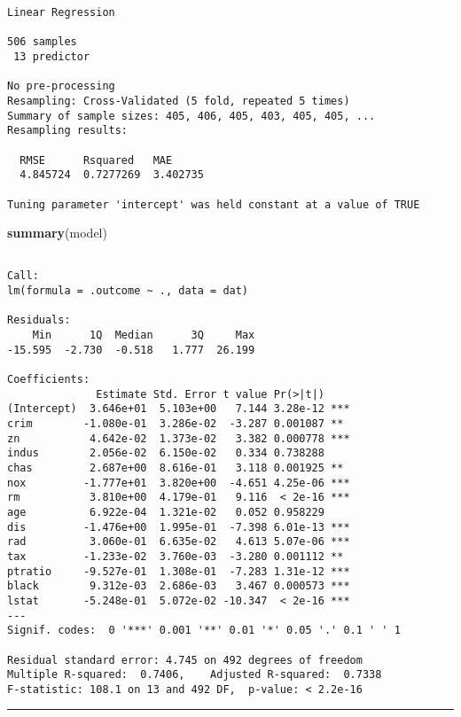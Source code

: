 \documentclass[
]{book}
\newenvironment{Shaded}{\begin{snugshade}}{\end{snugshade}}
\newcommand{\KeywordTok}[1]{\textcolor[rgb]{0.13,0.29,0.53}{\textbf{#1}}}
\newcommand{\NormalTok}[1]{#1}
\begin{document}
\begin{verbatim}
Linear Regression 

506 samples
 13 predictor

No pre-processing
Resampling: Cross-Validated (5 fold, repeated 5 times) 
Summary of sample sizes: 405, 406, 405, 403, 405, 405, ... 
Resampling results:

  RMSE      Rsquared   MAE     
  4.845724  0.7277269  3.402735

Tuning parameter 'intercept' was held constant at a value of TRUE
\end{verbatim}

\begin{Shaded}
\begin{Highlighting}[]
\KeywordTok{summary}\NormalTok{(model)}
\end{Highlighting}
\end{Shaded}

\begin{verbatim}

Call:
lm(formula = .outcome ~ ., data = dat)

Residuals:
    Min      1Q  Median      3Q     Max 
-15.595  -2.730  -0.518   1.777  26.199 

Coefficients:
              Estimate Std. Error t value Pr(>|t|)    
(Intercept)  3.646e+01  5.103e+00   7.144 3.28e-12 ***
crim        -1.080e-01  3.286e-02  -3.287 0.001087 ** 
zn           4.642e-02  1.373e-02   3.382 0.000778 ***
indus        2.056e-02  6.150e-02   0.334 0.738288    
chas         2.687e+00  8.616e-01   3.118 0.001925 ** 
nox         -1.777e+01  3.820e+00  -4.651 4.25e-06 ***
rm           3.810e+00  4.179e-01   9.116  < 2e-16 ***
age          6.922e-04  1.321e-02   0.052 0.958229    
dis         -1.476e+00  1.995e-01  -7.398 6.01e-13 ***
rad          3.060e-01  6.635e-02   4.613 5.07e-06 ***
tax         -1.233e-02  3.760e-03  -3.280 0.001112 ** 
ptratio     -9.527e-01  1.308e-01  -7.283 1.31e-12 ***
black        9.312e-03  2.686e-03   3.467 0.000573 ***
lstat       -5.248e-01  5.072e-02 -10.347  < 2e-16 ***
---
Signif. codes:  0 '***' 0.001 '**' 0.01 '*' 0.05 '.' 0.1 ' ' 1

Residual standard error: 4.745 on 492 degrees of freedom
Multiple R-squared:  0.7406,    Adjusted R-squared:  0.7338 
F-statistic: 108.1 on 13 and 492 DF,  p-value: < 2.2e-16
\end{verbatim}

\begin{center}\rule{0.5\linewidth}{0.5pt}\end{center}
\end{document}

